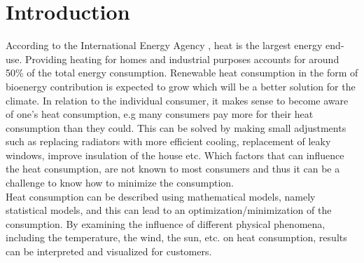 \chapter{Introduction}
\noindent According to the International Energy Agency \cite{iea}, heat is the largest energy end-use. Providing heating for homes and industrial purposes accounts for around 50\% of the total energy consumption. Renewable heat consumption in the form of bioenergy contribution is expected to grow which will be a better solution for the climate. In relation to the individual consumer, it makes sense to become aware of one's heat consumption, e.g many consumers pay more for their heat consumption than they could. This can be solved by making small adjustments such as replacing radiators with more efficient cooling, replacement of leaky windows, improve insulation of the house etc. Which factors that can influence the heat consumption, are not known to most consumers and thus it can be a challenge to know how to minimize the consumption. \\

\noindent Heat consumption can be described using mathematical models, namely statistical models, and this can lead to an optimization/minimization of the consumption. 
By examining the influence of different physical phenomena, including the temperature, the wind, the sun, etc. on heat consumption, results can be interpreted and visualized for customers.

